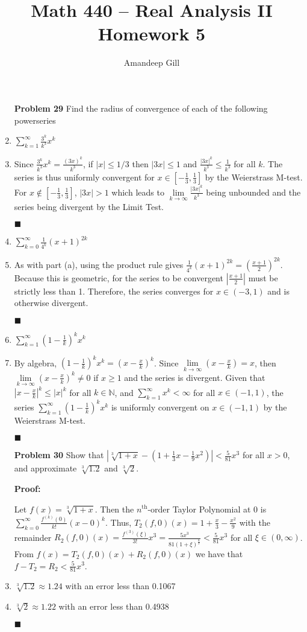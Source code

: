 \documentclass[a4paper,12pt]{report}
\newcommand{\bb}[1]{\mathbb{#1}}
\newcommand{\proof}[3]{
	\begin{enumerate}
		\item[\bf{Problem #1}] #2
		\item[\textbf{Proof:}]
		#3
		\begin{flushright}
			$\blacksquare$
		\end{flushright}
	\end{enumerate}
}
\newcommand{\problem}[3]{
	\begin{enumerate}
		\item[\bf{Problem #1}] #2 
		#3
	\end{enumerate}
}
\newcommand{\subproof}[3]{
	\item[#1] #2
	\item[\bf{Proof:}] 
	#3 
	\begin{flushright}
		$\blacksquare$
	\end{flushright}
}
\begin{document}
\title{Math 440 -- Real Analysis II \\ \vspace{7px} \large{Homework 5}}
\author{Amandeep Gill}
\maketitle

\problem{29}{
	Find the radius of convergence of each of the following powerseries
}{
	\subproof{(a)}{
		$\sum\limits_{k=1}^{\infty} \frac{3^k}{k^3} x^k$
	}{
		Since $\frac{3^k}{k^3} x^k = \frac{(3x)^k}{k^3}$, if $|x| \leqslant 1/3$ then $|3x| \leqslant 1$ and $\frac{|3x|^k}{k^3} \leqslant \frac{1}{k^3}$ for all $k$. The series is thus uniformly convergent for $x \in [-\frac{1}{3}, \frac{1}{3}]$ by the Weierstrass M-test. For $x \notin [-\frac{1}{3},\frac{1}{3}]$, $|3x| > 1$ which leads to $\lim\limits_{k \to \infty} \frac{|3x|^k}{k^3}$ being unbounded and the series being divergent by the Limit Test.
	}
	\subproof{(b)}{
		$\sum\limits_{k=0}^{\infty}\frac{1}{4^k}(x+1)^{2k}$
	}{
		As with part (a), using the product rule gives $\frac{1}{4^k}(x+1)^{2k} = \left(\frac{x+1}{2}\right)^{2k}$. Because this is geometric, for the series to be convergent $\left|\frac{x+1}{2}\right|$ must be strictly less than 1. Therefore, the series converges for $x \in (-3,1)$ and is otherwise divergent.
	}
	\subproof{(c)}{
		$\sum\limits_{k=1}^{\infty}\left(1-\frac{1}{k}\right)^k x^k$
	}{
		By algebra, $\left(1-\frac{1}{k}\right)^k x^k = \left(x-\frac{x}{k}\right)^k$. Since $\lim\limits_{k \to \infty}\left(x-\frac{x}{k}\right) = x$, then $\lim\limits_{k \to \infty} \left(x-\frac{x}{k}\right)^k \neq 0$ if $x \geqslant 1$ and the series is divergent. Given that $\left|x-\frac{x}{k}\right|^k \leqslant |x|^k$ for all $k \in \bb{N}$, and $\sum\limits_{k=1}^{\infty} x^k < \infty$ for all $x \in (-1,1)$, the series $\sum\limits_{k=1}^{\infty}\left(1-\frac{1}{k}\right)^k x^k$ is uniformly convergent on $x \in (-1,1)$ by the Weierstrass M-test.
	}
}

\pagebreak

\proof{30}{
	Show that $|\sqrt[3]{1+x} - (1 + \frac{1}{3}x - \frac{1}{9}x^2)| < \frac{5}{81}x^3$ for all $x > 0$, and approximate $\sqrt[3]{1.2}$ and $\sqrt[3]{2}$.
}{
	Let $f(x) = \sqrt[3]{1+x}$. Then the $n^\text{th}$-order Taylor Polynomial at 0 is $\sum\limits_{k=0}^{\infty}\frac{f^{(k)}(0)}{k!}(x - 0)^k$. Thus, $T_2(f,0)(x) = 1 + \frac{x}{3} - \frac{x^2}{9}$ with the remainder $R_2(f,0)(x) = \frac{f^{(3)}(\xi)}{3!}x^{3} = \frac{5x^3}{81(1+\xi)^{\frac{8}{3}}} < \frac{5}{81}x^3$ for all $\xi \in (0,\infty)$. From $f(x) = T_2(f,0)(x) + R_2(f,0)(x)$ we have that $f - T_2 = R_2 < \frac{5}{81}x^3$.
	\\
	\item $\sqrt[3]{1.2} \approx 1.24$ with an error less than 0.1067
	\item $\sqrt[3]{2} \approx 1.22$ with an error less than 0.4938
}
\end{document}

